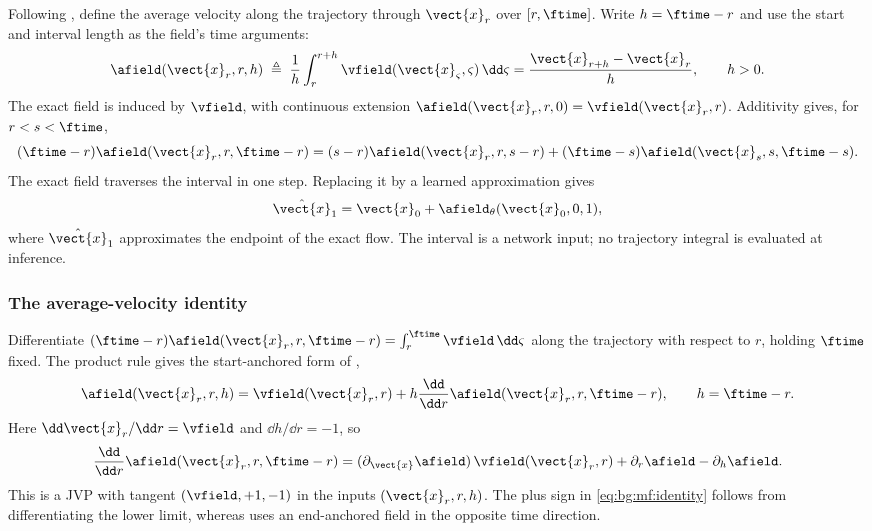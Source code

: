 Following \parencite[Eq.~(3)]{geng2025meanflow}, define the average velocity along the trajectory
through $\vect{x}_{r}$ over $[r,\ftime]$. Write $h=\ftime-r$ and use the start and interval length
as the field's time arguments:
\begin{equation}\label{eq:bg:mf:def}
  \afield(\vect{x}_{r},r,h)
  \;\triangleq\; \frac{1}{h}\int_{r}^{r+h}
      \vfield(\vect{x}_{\varsigma},\varsigma)\,\dd\varsigma
  = \frac{\vect{x}_{r+h}-\vect{x}_{r}}{h},\qquad h>0.
\end{equation}
The exact field is induced by $\vfield$, with continuous extension
$\afield(\vect{x}_{r},r,0)=\vfield(\vect{x}_{r},r)$. Additivity gives, for $r<s<\ftime$,
\[
(\ftime-r)\afield(\vect{x}_{r},r,\ftime-r)
=(s-r)\afield(\vect{x}_{r},r,s-r)
 +(\ftime-s)\afield(\vect{x}_{s},s,\ftime-s).
\]
The exact field traverses the interval in one step. Replacing it by a learned approximation gives
\begin{equation}\label{eq:bg:mf:onestep}
  \hat{\vect{x}}_{1} = \vect{x}_{0}+\afield_{\theta}(\vect{x}_{0},0,1),
\end{equation}
where $\hat{\vect{x}}_{1}$ approximates the endpoint of the exact flow. The interval is a network
input; no trajectory integral is evaluated at inference.

\subsubsection*{The average-velocity identity}

Differentiate $(\ftime-r)\afield(\vect{x}_{r},r,\ftime-r)
=\int_{r}^{\ftime}\vfield\,\dd\varsigma$ along the trajectory with respect to $r$, holding
$\ftime$ fixed. The product rule gives the start-anchored form of
\parencite[Eqs.~(4)--(6)]{geng2025meanflow},
\begin{equation}\label{eq:bg:mf:identity}
  \afield(\vect{x}_{r},r,h)
  = \vfield(\vect{x}_{r},r)+h\frac{\dd}{\dd r}
      \afield(\vect{x}_{r},r,\ftime-r),\qquad h=\ftime-r.
\end{equation}
Here $\dd\vect{x}_{r}/\dd r=\vfield$ and $\dd h/\dd r=-1$, so
\begin{equation}\label{eq:bg:mf:jvp}
  \frac{\dd}{\dd r}\afield(\vect{x}_{r},r,\ftime-r)
  = (\partial_{\vect{x}}\afield)\,\vfield(\vect{x}_{r},r)
    +\partial_{r}\afield-\partial_{h}\afield.
\end{equation}
This is a \ac{JVP} with tangent $(\vfield,+1,-1)$ in the inputs $(\vect{x}_{r},r,h)$.
The plus sign in \eqref{eq:bg:mf:identity} follows from differentiating the lower limit, whereas
\parencite[Eq.~(6)]{geng2025meanflow} uses an end-anchored field in the opposite time direction.

